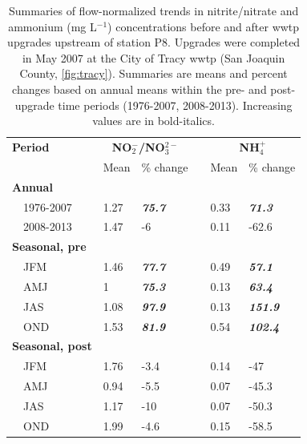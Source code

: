 \documentclass[letterpaper,12pt,oneside]{article}\usepackage[]{graphicx}\usepackage[]{color}
\begin{document}
\begin{table}[!tbp]
\caption{Summaries of flow-normalized trends in nitrite/nitrate and ammonium (mg L$^{-1}$) concentrations before and after \ac{wwtp} upgrades upstream of station P8. Upgrades were completed in May 2007 at the City of Tracy \ac{wwtp} (San Joaquin County, \cref{fig:tracy}).  Summaries are means and percent changes based on annual means within the pre- and post-upgrade time periods (1976-2007, 2008-2013).  Increasing values are in bold-italics.\label{tab:p8chg}} 
\begin{center}
\begin{tabular}{lllcll}
\hline\hline
\multicolumn{1}{l}{\bfseries Period}&\multicolumn{2}{c}{\bfseries NO$_{2}^{-}$/NO$_{3}^{2-}$}&\multicolumn{1}{c}{\bfseries }&\multicolumn{2}{c}{\bfseries NH$_{4}^{+}$}\tabularnewline
\cline{2-3} \cline{5-6}
\multicolumn{1}{l}{}&\multicolumn{1}{c}{Mean}&\multicolumn{1}{c}{\% change}&\multicolumn{1}{c}{}&\multicolumn{1}{c}{Mean}&\multicolumn{1}{c}{\% change}\tabularnewline
\hline
{\bfseries Annual}&&&&&\tabularnewline
~~1976-2007&1.27&\textit{\textbf{75.7}}&&0.33&\textit{\textbf{71.3}}\tabularnewline
~~2008-2013&1.47&-6&&0.11&-62.6\tabularnewline
\hline
{\bfseries Seasonal, pre}&&&&&\tabularnewline
~~JFM&1.46&\textit{\textbf{77.7}}&&0.49&\textit{\textbf{57.1}}\tabularnewline
~~AMJ&1&\textit{\textbf{75.3}}&&0.13&\textit{\textbf{63.4}}\tabularnewline
~~JAS&1.08&\textit{\textbf{97.9}}&&0.13&\textit{\textbf{151.9}}\tabularnewline
~~OND&1.53&\textit{\textbf{81.9}}&&0.54&\textit{\textbf{102.4}}\tabularnewline
\hline
{\bfseries Seasonal, post}&&&&&\tabularnewline
~~JFM&1.76&-3.4&&0.14&-47\tabularnewline
~~AMJ&0.94&-5.5&&0.07&-45.3\tabularnewline
~~JAS&1.17&-10&&0.07&-50.3\tabularnewline
~~OND&1.99&-4.6&&0.15&-58.5\tabularnewline
\hline
\end{tabular}\end{center}

\end{table}
\end{document}
